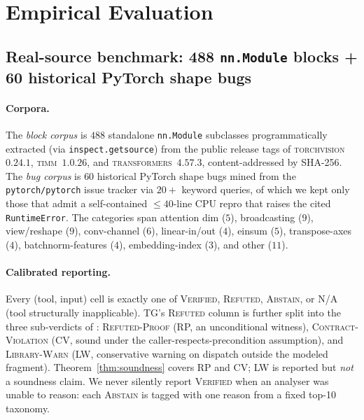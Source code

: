 \section{Empirical Evaluation}\label{sec:eval}

\subsection{Real-source benchmark: 488 \texttt{nn.Module} blocks
  + 60 historical PyTorch shape bugs}
\label{sec:eval-benchmark}

\paragraph{Corpora.}
The \emph{block corpus} is $488$ standalone \texttt{nn.Module}
subclasses programmatically extracted (via
\texttt{inspect.getsource}) from the public release tags of
\textsc{torchvision}~$0.24.1$, \textsc{timm}~$1.0.26$, and
\textsc{transformers}~$4.57.3$, content-addressed by SHA-256.
The \emph{bug corpus} is $60$ historical PyTorch shape bugs
mined from the \texttt{pytorch/pytorch} issue tracker via
$20{+}$ keyword queries, of which we kept only those that
admit a self-contained $\le 40$-line CPU repro that raises the
cited \texttt{RuntimeError}. The categories span attention dim
($5$), broadcasting ($9$), view/reshape ($9$),
conv-channel ($6$), linear-in/out ($4$), einsum ($5$),
transpose-axes ($4$), batchnorm-features ($4$), embedding-index
($3$), and other ($11$).

\paragraph{Calibrated reporting.} Every (tool, input) cell is
exactly one of \textsc{Verified}, \textsc{Refuted},
\textsc{Abstain}, or \textsc{N/A} (tool structurally
inapplicable). \textsc{TG}'s \textsc{Refuted} column is further
split into the three sub-verdicts of :
\textsc{Refuted-Proof} (RP, an unconditional witness),
\textsc{Contract-Violation} (CV, sound under the caller-respects-precondition
assumption), and \textsc{Library-Warn} (LW, conservative warning
on dispatch outside the modeled fragment). Theorem~\ref{thm:soundness}
covers RP and CV; LW is reported but \emph{not} a soundness claim.
We never silently report \textsc{Verified} when an analyser was
unable to reason: each \textsc{Abstain} is tagged with one
reason from a fixed top-10 taxonomy.

